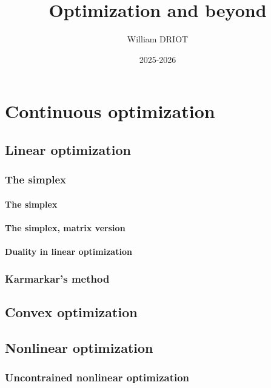 \documentclass[12pt]{book}
\title{\textbf{Optimization and beyond}}
\author{William DRIOT}
\date{2025-2026}
\begin{document}
\maketitle

\tableofcontents

\newpage


% 
% 
% 
% 

\part{Continuous optimization}

\chapter{Linear optimization}

\section{The simplex}
\subsection{The simplex}
\subsection{The simplex, matrix version}
\subsection{Duality in linear optimization}
\section{Karmarkar's method}

\chapter{Convex optimization}

\chapter{Nonlinear optimization}

\section{Uncontrained nonlinear optimization}
\end{document}
